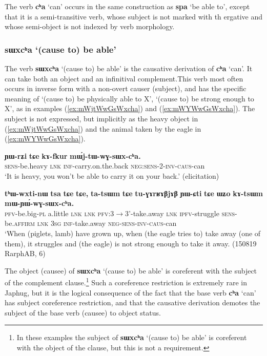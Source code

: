 \documentclass[oneside,a4paper,11pt]{article}
\newcommand{\ipa}[1]{\textbf{\phon#1}} %
\newcommand{\jpg}[2]{\ipa{#1} `#2'} %
\newcommand{\refb}[1]{(\ref{#1})}
\begin{document}
The verb \jpg{cʰa}{can} occurs in the same construction as \jpg{spa}{be able to}, except that it is a semi-transitive verb, whose subject is not marked with th ergative and whose semi-object is not indexed by verb morphology.


  \subsubsection{\jpg{sɯxcʰa}{(cause to) be able}} \label{sec:sWxcha}
The verb \jpg{sɯxcʰa}{(cause to) be able}  is the causative derivation of \jpg{cʰa}{can}.  It can take both an object and an infinitival complement.This verb most often occurs in inverse form with a non-overt causer (subject), and has the specific meaning of  `(cause to) be physically able to X', `(cause to) be strong enough to X', as in examples (\ref{ex:mWjtWwGsWxcha}) and (\ref{ex:mWYWwGsWxcha}). The subject is not expressed, but implicitly as the heavy object in \refb{ex:mWjtWwGsWxcha} and the animal taken by the eagle in \refb{ex:mWYWwGsWxcha}.

\begin{exe}
\ex \label{ex:mWjtWwGsWxcha}
\gll \ipa{ɲɯ-rʑi} 	\ipa{tɕe} 	\ipa{kɤ-fkur}  	\ipa{mɯ́j-tɯ-wɣ-sɯx-cʰa.} \\
\textsc{sens}-be.heavy \textsc{lnk}  \textsc{inf}-carry.on.the.back \textsc{neg:sens-2-inv-caus}-can \\
\glt `It is heavy, you won't be able to carry it on your back.' (elicitation)
\end{exe}	

  
\begin{exe}
\ex \label{ex:mWYWwGsWxcha}
\gll \ipa{tʰɯ-wxti-nɯ} 	\ipa{tsa} 	\ipa{tɕe} 	\ipa{tɕe,} 	\ipa{ta-tsɯm} 	\ipa{tɕe} 	\ipa{tu-ɣɤrʁɤβjɤβ} 	\ipa{ɲɯ-ɕti} 	\ipa{tɕe} 	\ipa{ɯʑo} 	\ipa{kɤ-tsɯm} 	\ipa{mɯ-ɲɯ́-wɣ-sɯx-cʰa.} \\
\textsc{pfv}-be.big-\textsc{pl} a.little \textsc{lnk}  \textsc{lnk} \textsc{pfv}:3$\rightarrow$3'-take.away \textsc{lnk} \textsc{ipfv}-struggle \textsc{sens}-be.\textsc{affirm}   \textsc{lnk} \textsc{3sg} \textsc{inf}-take.away \textsc{neg-sens-inv-caus}-can \\
\glt `When (piglets, lamb) have grown up, when (the eagle tries to) take away (one of them), it struggles and (the eagle) is not strong enough to take it away. (150819 RarphAB, 6)
\end{exe}	

The object (causee) of \jpg{sɯxcʰa}{(cause to) be able}  is coreferent with the subject of the complement clause.\footnote{In these examples the subject of \jpg{sɯxcʰa}{(cause to) be able} is coreferent with the object of the clause, but this is not a requirement.} Such a coreference restriction is extremely rare in Japhug, but it is the logical consequence of the fact that the base verb \jpg{cʰa}{can} has subject coreference restriction, and that the causative derivation demotes the subject of the base verb (causee) to object status.
\end{document}
